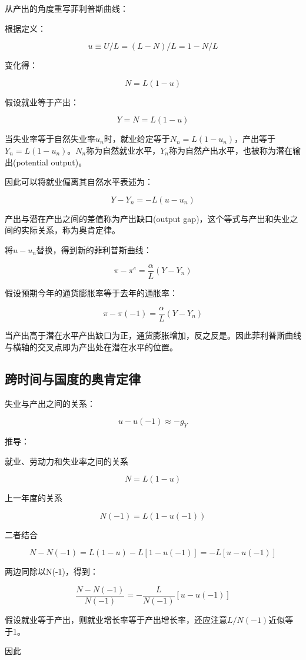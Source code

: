\documentclass{article}
\begin{document}
\hspace*{\fill}

从产出的角度重写菲利普斯曲线：

根据定义：

\[
u\equiv U/L=(L-N)/L=1-N/L
\]

变化得：

\[
N=L(1-u)
\]

假设就业等于产出：

\[
Y=N=L(1-u)
\]

当失业率等于自然失业率$ u_n $时，就业给定等于$ N_n=L(1-u_n) $，产出等于$ Y_n=L(1-u_n) $。$ N_n $称为自然就业水平，$ Y_n $称为自然产出水平，也被称为潜在输出(potential output)。

因此可以将就业偏离其自然水平表述为：

\[
Y-Y_n=-L(u-u_n)
\]

产出与潜在产出之间的差值称为产出缺口(output gap)，这个等式与产出和失业之间的实际关系，称为奥肯定律。

将$ u-u_n $替换，得到新的菲利普斯曲线：

\[
\pi-\pi^e=\frac{\alpha}{L}(Y-Y_n)
\]

假设预期今年的通货膨胀率等于去年的通胀率：

\[
\pi-\pi(-1)=\frac{\alpha}{L}(Y-Y_n)
\]

当产出高于潜在水平产出缺口为正，通货膨胀增加，反之反是。因此菲利普斯曲线与横轴的交叉点即为产出处在潜在水平的位置。

\subsection{跨时间与国度的奥肯定律}

失业与产出之间的关系：

\[
u-u(-1)\approx -g_Y
\]

推导：

就业、劳动力和失业率之间的关系

\[
N=L(1-u)
\]

上一年度的关系

\[
N(-1)=L(1-u(-1))
\]

二者结合

\[
N-N(-1)=L(1-u)-L[1-u(-1)]=-L[u-u(-1)]
\]

两边同除以N(-1)，得到：

\[
\frac{N-N(-1)}{N(-1)}=-\frac{L}{N(-1)}[u-u(-1)]
\]

假设就业等于产出，则就业增长率等于产出增长率，还应注意$ L/N(-1) $近似等于1。

因此
\end{document}
